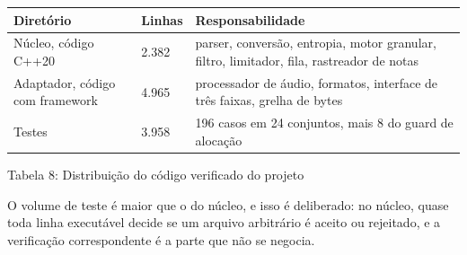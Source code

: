 \documentclass[12pt,a4paper]{article}
\begin{document}
\begin{center}
\footnotesize
\setlength{\tabcolsep}{4pt}
\begin{tabular}{p{}|p{}|p{}}
\hline
\textbf{Diretório} & \textbf{Linhas} & \textbf{Responsabilidade} \\
\hline
Núcleo, código C++20 & 2.382 & parser, conversão, entropia, motor granular, filtro, limitador, fila, rastreador de notas \\
Adaptador, código com framework & 4.965 & processador de áudio, formatos, interface de três faixas, grelha de bytes \\
Testes & 3.958 & 196 casos em 24 conjuntos, mais 8 do guard de alocação \\
\hline
\end{tabular}
\end{center}
\noindent Tabela 8: Distribuição do código verificado do projeto\par
\label{tab:8}
\vspace{2pt}{\footnotesize\noindent Elaborado pelos autores (2026).\par}

O volume de teste é maior que o do núcleo, e isso é deliberado: no núcleo, quase toda linha executável decide se um arquivo arbitrário é aceito ou rejeitado, e a verificação correspondente é a parte que não se negocia.



\begingroup
\small
\setlength{\parskip}{0pt}


\endgroup
\end{document}
